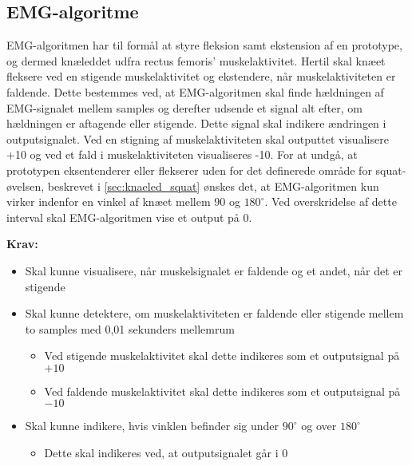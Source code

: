 \subsection{EMG-algoritme}\label{sec:krav_emg_algo}
EMG-algoritmen har til formål at styre fleksion samt ekstension af en prototype, og dermed knæleddet udfra rectus femoris' muskelaktivitet. Hertil skal knæet fleksere ved en stigende muskelaktivitet og ekstendere, når muskelaktiviteten er faldende.
Dette bestemmes ved, at EMG-algoritmen skal finde hældningen af EMG-signalet mellem samples og derefter udsende et signal alt efter, om hældningen er aftagende eller stigende. Dette signal skal indikere ændringen i outputsignalet. Ved en stigning af muskelaktiviteten skal outputtet visualisere +10 og ved et fald i muskelaktiviteten visualiseres -10.
For at undgå, at prototypen eksentenderer eller flekserer uden for det definerede område for squat-øvelsen, beskrevet i \autoref{sec:knaeled_squat} ønskes det, at EMG-algoritmen kun virker indenfor en vinkel af knæet mellem $90$ og $180^{\circ}$. Ved overskridelse af dette interval skal EMG-algoritmen vise et output på 0.


\vspace{3mm}
\textbf{Krav:}
\begin{itemize}
\item Skal kunne visualisere, når muskelsignalet er faldende og et andet, når det er stigende
\item Skal kunne detektere, om muskelaktiviteten er faldende eller stigende mellem to samples med 0,01 sekunders mellemrum
\begin{itemize}
\item Ved stigende muskelaktivitet skal dette indikeres som et outputsignal på $+10$
\item Ved faldende muskelaktivitet skal dette indikeres som et outputsignal på $-10$
\end{itemize}
\item Skal kunne indikere, hvis vinklen befinder sig under $90^{\circ}$ og over $180^{\circ}$
\begin{itemize}
\item Dette skal indikeres ved, at outputsignalet går i $0$
\end{itemize}
\end{itemize}


